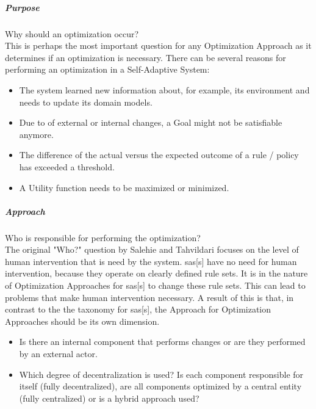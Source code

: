 \subparagraph*{Purpose}
Why should an optimization occur? \\
This is perhaps the most important question for any Optimization Approach as it determines if an optimization is necessary.
There can be several reasons for performing an optimization in a Self-Adaptive System:
\begin{itemize}[nosep]
    \item The system learned new information about, for example, its environment and needs to update its domain models.
    \item Due to of external or internal changes, a Goal might not be satisfiable anymore.
    \item The difference of the actual versus the expected outcome of a rule / policy has exceeded a threshold.
    \item A Utility function needs to be maximized or minimized.
\end{itemize}

\subparagraph*{Approach}
Who is responsible for performing the optimization? \\
The original "Who?" question by Salehie and Tahvildari focuses on the level of human intervention that is need by the system.
\acrlong{sas}[s] have no need for human intervention, because they operate on clearly defined rule sets.
It is in the nature of Optimization Approaches for \acrlong{sas}[s] to change these rule sets.
This can lead to problems that make human intervention necessary.
A result of this is that, in contrast to the the taxonomy for \acrlong{sas}[s], 
the Approach for Optimization Approaches should be its own dimension.
\begin{itemize}[nosep]
    \item Is there an internal component that performs changes or are they performed by an external actor.
    \item Which degree of decentralization is used?
    Is each component responsible for itself (fully decentralized), are all components optimized by a central entity (fully centralized)
    or is a hybrid approach used?
\end{itemize}

